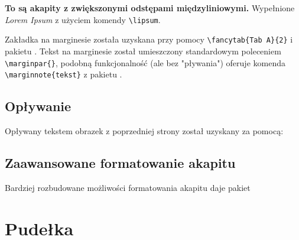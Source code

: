 \documentclass[fontSize=10pt,extra]{pdfArticle}
\begin{document}
\begin{spacing}{1.7}
\textbf{To są akapity z zwiększonymi odstępami międzyliniowymi.} Wypełnione \emph{Lorem Ipsum} z użyciem komendy \Verb$\lipsum$.
\lipsum[1][1-13]
\lipsum[2]

Zakładka na marginesie została uzyskana przy pomocy \Verb$\fancytab{Tab A}{2}$ i pakietu .
Tekst na marginesie został umieszczony standardowym poleceniem \Verb$\marginpar{}$,
	podobną funkcjonalność (ale bez "pływania") oferuje komenda \Verb$\marginnote{tekst}$ z pakietu .

\end{spacing}

\nopagecolor


\subsection{Opływanie}
Opływany tekstem obrazek z poprzedniej strony został uzyskany za pomocą:
\putExampleVerbatimAdjust


\subsection{Zaawansowane formatowanie akapitu}

Bardziej rozbudowane możliwości formatowania akapitu daje pakiet 



\clearpage
\section{Pudełka}
\end{document}
